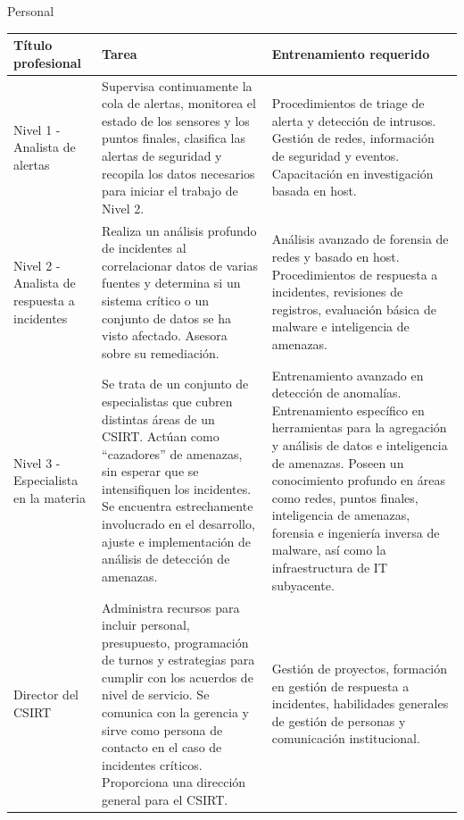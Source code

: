 \begin{section}{Personal}
    \begin{table}%
    \centering
        \begin{tabular}{ | m{10em} | m{16em}| m{11em} | } 
            \hline
            Título profesional & Tarea & Entrenamiento requerido \\ 
            \hline
            Nivel 1 - Analista de alertas & Supervisa continuamente la cola de alertas, monitorea el estado de los sensores y los puntos finales, clasifica las alertas de seguridad y recopila los datos necesarios para iniciar el trabajo de Nivel 2. & Procedimientos de triage de alerta y detección de intrusos. Gestión de redes, información de seguridad y eventos. Capacitación en investigación basada en host. \\ 
            \hline
            Nivel 2 - Analista de respuesta a incidentes & Realiza un análisis profundo de incidentes al correlacionar datos de varias fuentes y determina si un sistema crítico o un conjunto de datos se ha visto afectado. Asesora sobre su remediación. & Análisis avanzado de forensia de redes y basado en host. Procedimientos de respuesta a incidentes, revisiones de registros, evaluación básica de malware e inteligencia de amenazas. \\ 
            \hline
            Nivel 3 - Especialista en la materia & Se trata de un conjunto de especialistas que cubren distintas áreas de un CSIRT. 
            Actúan como “cazadores” de amenazas, sin esperar que se intensifiquen los incidentes. Se encuentra estrechamente involucrado en el desarrollo, ajuste e implementación de análisis de detección de amenazas.
             & Entrenamiento avanzado en detección de anomalías. Entrenamiento específico en herramientas para la agregación y análisis de datos e inteligencia de amenazas. 
            Poseen un conocimiento profundo en áreas como redes, puntos finales, inteligencia de amenazas, forensia e ingeniería inversa de malware, así como la infraestructura de IT subyacente.
            \\ 
             \hline
            Director del CSIRT & Administra recursos para incluir personal, presupuesto, programación de turnos y estrategias para cumplir con los acuerdos de nivel de servicio. Se comunica con la gerencia y sirve como persona de contacto en el caso de incidentes críticos. Proporciona una dirección general para el CSIRT. & Gestión de proyectos, formación en gestión de respuesta a incidentes, habilidades generales de gestión de personas y comunicación institucional.  \\

\end{tabular}
\end{table}
\end{section}
